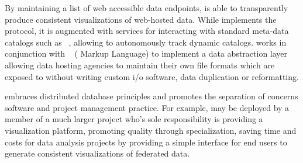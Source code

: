 By maintaining a list of web accessible data endpoints, \sciwms{} is
able to transparently produce consistent visualizations of web-hosted
data. While \sciwms{} implements the \ogc{} \wms{}~\cite{wms14}
protocol, it is augmented with services for interacting with standard
meta-data catalogs such as \csw{}~\cite{csw14}, allowing \sciwms{}
to autonomously track dynamic catalogs. \sciwms{} works in conjunction
with \ncml{}~\cite{ncml06} (\netcdf{} Markup Language) to implement a data
abstraction layer allowing data hosting agencies to maintain their own
file formats which are exposed to \sciwms{} without writing custom i/o
software, data duplication or reformatting.

\sciwms{} embraces distributed database principles and promotes the
separation of concerns software and project management practice. For
example, \sciwms{} may be deployed by a member of a much larger
project who's sole responsibility is providing a visualization
platform, promoting quality through specialization, saving time and
costs for data analysis projects by providing a simple interface for
end users to generate consistent visualizations of federated data.
